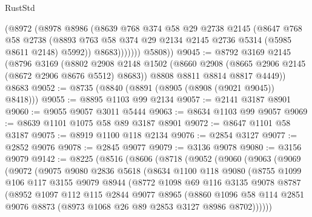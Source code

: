 \begin{lexlean}{RustStd}
\begin{coremodule}
                (@8972
                  (@8978
                    @8986
                    (@8639
                      @768
                      @374
                      @58
                      @29
                      @2738
                      @2145
                      (@8647
                        @768
                        @58
                        @2738
                        (@8893 @763 @58 @374 @29 @2134 @2145 @2736 @5314 (@5985 @8611 @2148) @5992))
                      @8683)))))))
        @5808))
@9045 := @8792
    @3169
    @2145
    (@8796
      @3169
      (@8802
        @2908
        @2148
        @1502
        (@8660 @2908 (@8665 @2906 @2145 (@8672 @2906 @8676 @5512) @8683))
        @8808
        @8811
        @8814
        @8817
        @4449))
    @8683
@9052 := @8735 (@8840 (@8891 (@8905 (@8908 (@9021 @9045)) @8418)))
@9055 := @8895 @1103 @99 @2134
@9057 := @2141 @3187 @8901
@9060 := @9055 @9057 @3011 @5444
@9063 := @8634 @1103 @99 @9057
@9069 := @8639 @1101 @1075 @58 @89 @3187 @8901
@9072 := @8647 @1101 @58 @3187
@9075 := @8919 @1100 @118 @2134
@9076 := @2854 @3127
@9077 := @2852 @9076
@9078 := @2845 @9077
@9079 := @3136 @9078
@9080 := @3156 @9079
@9142 := @8225
    (@8516
      (@8606
        (@8718
          (@9052
            (@9060
              (@9063
                (@9069
                  (@9072
                    (@9075
                      @9080
                      @2836
                      @5618
                      (@8634
                        @1100
                        @118
                        @9080
                        (@8755
                          @1099
                          @106
                          @117
                          @3155
                          @9079
                          @8944
                          (@8772
                            @1098
                            @69
                            @116
                            @3135
                            @9078
                            @8787
                            (@8952
                              @1097
                              @112
                              @115
                              @2844
                              @9077
                              @8965
                              (@8860
                                @1096
                                @58
                                @114
                                @2851
                                @9076
                                @8873
                                (@8973 @1068 @26 @89 @2853 @3127 @8986 @8702))))))

\end{coremodule}
\end{lexlean}
